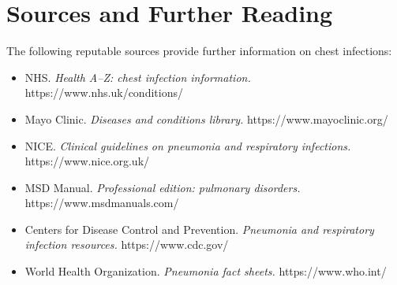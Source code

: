 \section*{Sources and Further Reading}
The following reputable sources provide further information on chest infections:
\begin{itemize}
    \item NHS. \textit{Health A--Z: chest infection information.} https://www.nhs.uk/conditions/
    \item Mayo Clinic. \textit{Diseases and conditions library.} https://www.mayoclinic.org/
    \item NICE. \textit{Clinical guidelines on pneumonia and respiratory infections.} https://www.nice.org.uk/
    \item MSD Manual. \textit{Professional edition: pulmonary disorders.} https://www.msdmanuals.com/
    \item Centers for Disease Control and Prevention. \textit{Pneumonia and respiratory infection resources.} https://www.cdc.gov/
    \item World Health Organization. \textit{Pneumonia fact sheets.} https://www.who.int/
\end{itemize}
